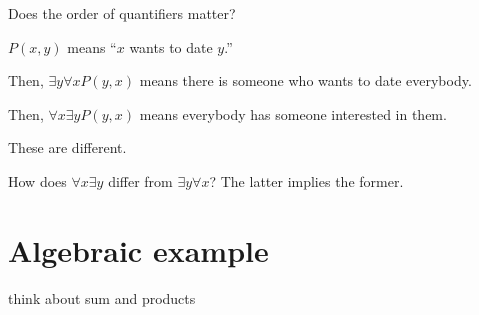 \documentclass[12pt]{handout}
\begin{document}
Does the order of quantifiers matter?

$P(x,y)$ means ``$x$ wants to date $y$.''

Then, $\exists y \forall x P(y,x)$ means there is someone who wants to date everybody.

Then, $\forall x \exists y P(y,x)$ means everybody has someone interested in them.

These are different.

How does $\forall x \exists y$ differ from $\exists y \forall x$?  The latter implies the former.

\section*{Algebraic example}

think about sum and products
\end{document}
